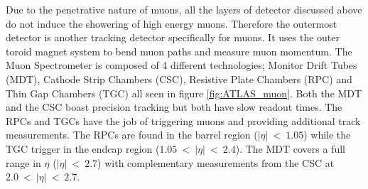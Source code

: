 		Due to the penetrative nature of muons, all the layers of detector discussed above do not induce the showering of high energy muons. Therefore the outermost detector is another tracking detector specifically for muons. It uses the outer toroid magnet system to bend muon paths and measure muon momentum. The Muon Spectrometer is composed of 4 different technologies; Monitor Drift Tubes (MDT), Cathode Strip Chambers (CSC), Resistive Plate Chambers (RPC) and Thin Gap Chambers (TGC) all seen in figure \ref{fig:ATLAS_muon}. Both the MDT and the CSC boast precision tracking but both have slow readout times. The RPCs and TGCs have the job of triggering muons and providing additional track measurements. The RPCs are found in the barrel region ($|\eta|~<~1.05$) while the TGC trigger in the endcap region ($1.05~<~|\eta|~<~2.4$). The MDT covers a full range in $\eta$ ($|\eta|~<~2.7$) with complementary measurements from the CSC at $2.0~<~|\eta|~<~2.7$.\\





